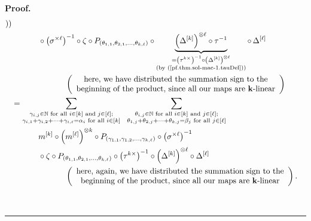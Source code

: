\documentclass[numbers=enddot,12pt,final,onecolumn,notitlepage]{scrartcl}%
\theoremstyle{definition}
\newenvironment{proof}[1][Proof]{\noindent\textbf{#1.} }{\ \rule{0.5em}{0.5em}}
\let\sumnonlimits\sum
\renewcommand{\sum}{\sumnonlimits\limits}
\begin{document}
\begin{proof}
\begin{align}
{{{))}}}\nonumber\\
&  \ \ \ \ \ \ \ \ \ \ \circ\left(  \sigma^{\times\ell}\right)  ^{-1}%
\circ\zeta\circ P_{\left(  \theta_{1,1},\theta_{2,1},\ldots,\theta_{k,\ell
}\right)  }\circ\underbrace{\left(  \Delta^{\left[  k\right]  }\right)
^{\otimes\ell}\circ\tau^{-1}}_{\substack{=\left(  \tau^{k\times}\right)
^{-1}\circ\left(  \Delta^{\left[  k\right]  }\right)  ^{\otimes\ell
}\\\text{(by (\ref{pf.thm.sol-mac-1.tauDel}))}}}\circ\,\Delta^{\left[
\ell\right]  }\nonumber\\
&  \ \ \ \ \ \ \ \ \ \ \ \ \ \ \ \ \ \ \ \ \left(
\begin{array}
[c]{c}%
\text{here, we have distributed the summation sign to the}\\
\text{beginning of the product, since all our maps are }\mathbf{k}%
\text{-linear}%
\end{array}
\right) \nonumber\\
&  =\sum_{\substack{\gamma_{i,j}\in\mathbb{N}\text{ for all }i\in\left[
k\right]  \text{ and }j\in\left[  \ell\right]  ;\\\gamma_{i,1}+\gamma
_{i,2}+\cdots+\gamma_{i,\ell}=\alpha_{i}\text{ for all }i\in\left[  k\right]
}}\ \ \sum_{\substack{\theta_{i,j}\in\mathbb{N}\text{ for all }i\in\left[
k\right]  \text{ and }j\in\left[  \ell\right]  ;\\\theta_{1,j}+\theta
_{2,j}+\cdots+\theta_{k,j}=\beta_{j}\text{ for all }j\in\left[  \ell\right]
}}\nonumber\\
&  \ \ \ \ \ \ \ \ \ \ m^{\left[  k\right]  }\circ\left(  m^{\left[
\ell\right]  }\right)  ^{\otimes k}\circ P_{\left(  \gamma_{1,1},\gamma
_{1,2},\ldots,\gamma_{k,\ell}\right)  }\circ\left(  \sigma^{\times\ell
}\right)  ^{-1}\nonumber\\
&  \ \ \ \ \ \ \ \ \ \ \circ\zeta\circ P_{\left(  \theta_{1,1},\theta
_{2,1},\ldots,\theta_{k,\ell}\right)  }\circ\left(  \tau^{k\times}\right)
^{-1}\circ\left(  \Delta^{\left[  k\right]  }\right)  ^{\otimes\ell}%
\circ\Delta^{\left[  \ell\right]  }\label{pf.thm.sol-mac-1.5}\\
&  \ \ \ \ \ \ \ \ \ \ \ \ \ \ \ \ \ \ \ \ \left(
\begin{array}
[c]{c}%
\text{here, again, we have distributed the summation sign to the}\\
\text{beginning of the product, since all our maps are }\mathbf{k}%
\text{-linear}%
\end{array}
\right)  .\nonumber
\end{align}



\end{proof}
\end{document}

